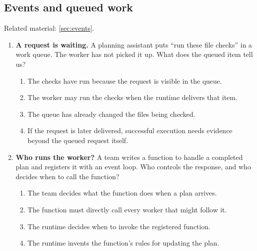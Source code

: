 \begin{enumerate}[start=31,itemsep=0.7\baselineskip]
\end{enumerate}

\subsection{Events and queued work}
\noindent Related material: \cref{sec:events}.

\begin{enumerate}[start=41,itemsep=0.7\baselineskip]
\item\label{exercise:41} \begin{minipage}[t]{\linewidth}
\textbf{A request is waiting.} A planning assistant puts ``run these file checks'' in a work queue. The worker has not picked it up. What does the queued item tell us?
\begin{enumerate}[label=\textnormal{(\Alph*)},leftmargin=*,itemsep=0pt]
\item The checks have run because the request is visible in the queue.
\item The worker may run the checks when the runtime delivers that item.
\item The queue has already changed the files being checked.
\item If the request is later delivered, successful execution needs evidence beyond the queued request itself.
\end{enumerate}
\end{minipage}

\item\label{exercise:42} \begin{minipage}[t]{\linewidth}
\textbf{Who runs the worker?} A team writes a function to handle a completed plan and registers it with an event loop. Who controls the response, and who decides when to call the function?
\begin{enumerate}[label=\textnormal{(\Alph*)},leftmargin=*,itemsep=0pt]
\item The team decides what the function does when a plan arrives.
\item The function must directly call every worker that might follow it.
\item The runtime decides when to invoke the registered function.
\item The runtime invents the function's rules for updating the plan.
\end{enumerate}
\end{minipage}


\end{enumerate}
